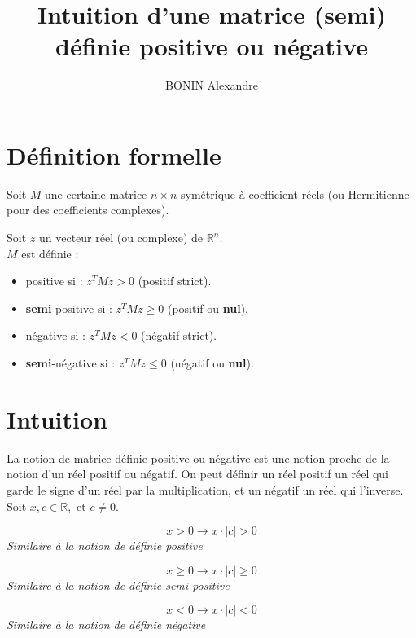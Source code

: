\documentclass[french]{article}
\title{Intuition d'une matrice (semi) définie positive ou négative}
\author{BONIN Alexandre}
\begin{document}
\maketitle

\tableofcontents

\section{Définition formelle}

Soit $M$ une certaine matrice $n\times n$ symétrique à coefficient réels (ou Hermitienne pour des coefficients complexes).

Soit $z$ un vecteur réel (ou complexe) de $\mathbb R^n$.\\

$M$ est définie :

\begin{itemize}
\item  positive si : $z^TMz > 0$ (positif strict).

\item  \textbf{semi}-positive si : $z^TMz \geq 0$ (positif ou \textbf{nul}).

\item  négative si : $z^TMz < 0$ (négatif strict).

\item  \textbf{semi}-négative si : $z^TMz \leq 0$ (négatif ou \textbf{nul}).
\end{itemize}

\section{Intuition}

La notion de matrice définie positive ou négative est une notion proche de la notion d'un réel positif ou négatif. On peut définir un réel positif un réel qui garde le signe d'un réel par la multiplication, et un négatif un réel qui l'inverse.\\

Soit $x, c \in \mathbb{R}, \text{ et } c \neq 0$.


\[
x > 0 \rightarrow x \cdot \left|c\right| > 0
\]
\textit{Similaire à la notion de définie positive}

\[
x \geq 0 \rightarrow x \cdot \left|c\right| \geq 0
\]
\textit{Similaire à la notion de définie semi-positive}

\[
x < 0 \rightarrow x \cdot \left|c\right| < 0
\]
\textit{Similaire à la notion de définie négative}
\end{document}
